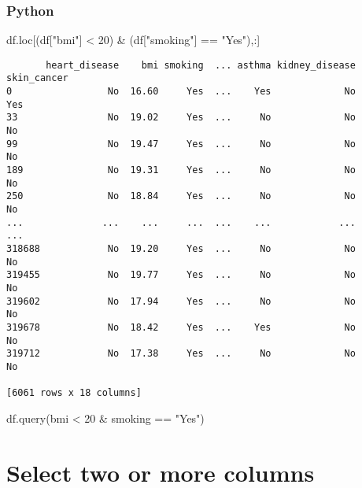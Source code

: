 \documentclass[
  letterpaper,
  DIV=11,
  numbers=noendperiod]{scrreprt}
\newenvironment{Shaded}{\begin{snugshade}}{\end{snugshade}}
\newcommand{\DecValTok}[1]{\textcolor[rgb]{0.68,0.00,0.00}{#1}}
\newcommand{\NormalTok}[1]{\textcolor[rgb]{0.00,0.46,0.62}{#1}}
\newcommand{\OperatorTok}[1]{\textcolor[rgb]{0.37,0.37,0.37}{#1}}
\newcommand{\StringTok}[1]{\textcolor[rgb]{0.13,0.47,0.30}{#1}}
\begin{document}
\hypertarget{python-16}{%
\subsubsection{Python}\label{python-16}}

\begin{Shaded}
\begin{Highlighting}[]
\NormalTok{df.loc[(df[}\StringTok{"bmi"}\NormalTok{] }\OperatorTok{\textless{}} \DecValTok{20}\NormalTok{) }\OperatorTok{\&}\NormalTok{ (df[}\StringTok{"smoking"}\NormalTok{] }\OperatorTok{==} \StringTok{"Yes"}\NormalTok{),:]}
\end{Highlighting}
\end{Shaded}

\begin{verbatim}
       heart_disease    bmi smoking  ... asthma kidney_disease  skin_cancer
0                 No  16.60     Yes  ...    Yes             No          Yes
33                No  19.02     Yes  ...     No             No           No
99                No  19.47     Yes  ...     No             No           No
189               No  19.31     Yes  ...     No             No           No
250               No  18.84     Yes  ...     No             No           No
...              ...    ...     ...  ...    ...            ...          ...
318688            No  19.20     Yes  ...     No             No           No
319455            No  19.77     Yes  ...     No             No           No
319602            No  17.94     Yes  ...     No             No           No
319678            No  18.42     Yes  ...    Yes             No           No
319712            No  17.38     Yes  ...     No             No           No

[6061 rows x 18 columns]
\end{verbatim}

\begin{Shaded}
\begin{Highlighting}[]
\NormalTok{df.query(}\StringTok{\textquotesingle{}bmi \textless{} 20 \& smoking == "Yes"\textquotesingle{}}\NormalTok{)}
\end{Highlighting}
\end{Shaded}

\hypertarget{select-two-or-more-columns}{%
\section{Select two or more columns}\label{select-two-or-more-columns}}
\end{document}
